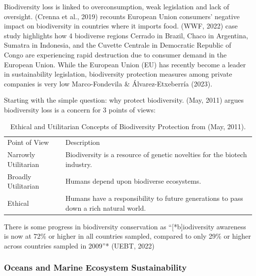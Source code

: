 \documentclass[
  12pt,
  letterpaper,
  DIV=11,
  numbers=noendperiod]{scrartcl}
\begin{document}
Biodiversity loss is linked to overconsumption, weak legislation and
lack of oversight. (Crenna et al., 2019) recounts European Union
consumers' negative impact on biodiversity in countries where it imports
food. (WWF, 2022) case study highlights how 4 biodiverse regions Cerrado
in Brazil, Chaco in Argentina, Sumatra in Indonesia, and the Cuvette
Centrale in Democratic Republic of Congo are experiencing rapid
destruction due to consumer demand in the European Union. While the
European Union (EU) has recently become a leader in sustainability
legislation, biodiversity protection measures among private companies is
very low Marco-Fondevila \& Álvarez-Etxeberría (2023).

Starting with the simple question: why protect biodiversity. (May, 2011)
argues biodiversity loss is a concern for 3 points of views:

\def\pandoctableshortcapt{Ethical and Utilitarian Concepts of
Biodiversity Protection}

\begin{longtable}[]{@{}
  >{\raggedright\arraybackslash}p{}
  >{\raggedright\arraybackslash}p{}@{}}
\caption[Ethical and Utilitarian Concepts of Biodiversity
Protection]{Ethical and Utilitarian Concepts of Biodiversity Protection
from (May, 2011).}\tabularnewline
\toprule\noalign{}
\endfirsthead
\endhead
\bottomrule\noalign{}
\endlastfoot
Point of View & Description \\
Narrowly Utilitarian & Biodiversity is a resource of genetic novelties
for the biotech industry. \\
Broadly Utilitarian & Humans depend upon biodiverse ecosystems. \\
Ethical & Humans have a responsibility to future generations to pass
down a rich natural world. \\
\end{longtable}

\let\pandoctableshortcapt\relax

There is some progress in biodiversity conservation as
``{[}*b{]}iodiversity awareness is now at 72\% or higher in all
countries sampled, compared to only 29\% or higher across countries
sampled in 2009''* (UEBT, 2022)

\subsubsection{Oceans and Marine Ecosystem
Sustainability}\label{oceans-and-marine-ecosystem-sustainability}
\end{document}
